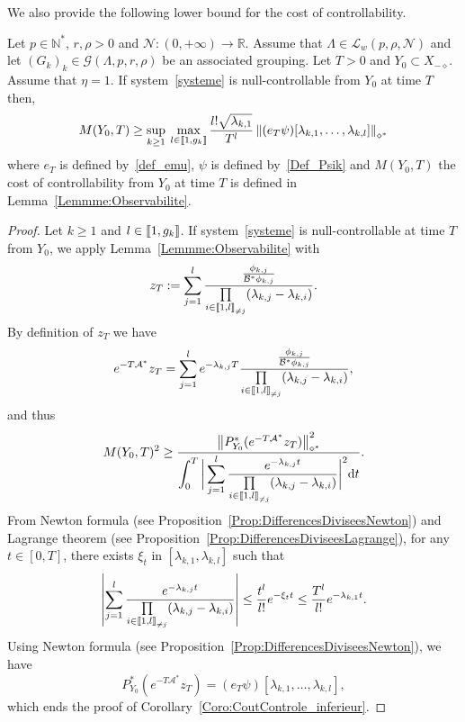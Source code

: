 \documentclass[10pt]{amsart}
\theoremstyle{definition}\newtheorem{defi}[theo]{Definition}\newtheorem{rema}[theo]{Remark}\newtheorem{exam}[theo]{Example}\newtheorem{exem}[theo]{Example}\newtheorem{nota}[theo]{Notation}
\newcommand{\llbracket}{\mathopen{[\mkern -2.7mu[}}
\newcommand{\rrbracket}{\mathclose{]\mkern -2.7mu]}}
\newcommand{\inter}[2]{\llbracket #1,#2 \rrbracket}
\newcommand{\interexclu}[3]{\llbracket #1,#2\rrbracket_{\neq #3}}
\newcommand\As{\mathcal{A}^*}
\newcommand\Bs{\mathcal{B}^*}
\newcommand{\Xmalpha}{X_{-\diamond}}
\newcommand{\Fzp}{Y_0}
\newcommand{\normeXalphas}[1]{\left\| #1 \right\|_{\diamond^*}}
\newcommand{\PFa}{P_{\Fzp}^*}
\newcommand{\n}{g}
\newcommand{\LL}{\mathcal{L}}
\newcommand{\NN}{\mathcal{N}}
\newcommand{\N}{\mathbb{N}}
\newcommand{\R}{\mathbb{R}}
\begin{document}
We also provide the following lower bound for the cost of controllability.
\begin{coro} \label{Coro:CoutControle_inferieur}
Let $p \in \N^*$, $r, \rho > 0$ and $\NN : (0,+\infty) \to \R$. Assume that $\Lambda \in \LL_w(p,\rho, \NN)$ and let $(G_k)_k\in \mathcal{G}(\Lambda,p,r,\rho)$ be an associated grouping. Let $T>0$ and $\Fzp \subset \Xmalpha$. Assume that $\eta=1$. If system~\eqref{systeme} is null-controllable from $\Fzp$ at time $T$ then,
\[
M(\Fzp,T) \geq \sup\limits_{k \geq 1} \: \max\limits_{l \in \inter{1}{\n_k}}
\frac{l! \sqrt{\lambda_{k,1}}}{T^l} \normeXalphas{ (e_T \psi) [\lambda_{k,1}, \dots, \lambda_{k,l}] }
\]
where $e_T$ is defined by~\eqref{def_emu}, $\psi$ is defined by~\eqref{Def_Psik} and $M(\Fzp,T)$ the cost of controllability from $\Fzp$ at time $T$ is defined in Lemma~\ref{Lemmme:Observabilite}.
\end{coro}


\begin{proof}
Let $k\geq1$ and $l \in \inter{1}{\n_k}$. If system~\eqref{systeme} is null-controllable at time $T$ from $\Fzp$, we apply Lemma~\ref{Lemmme:Observabilite} with
\[
z_T:=\sum_{j=1}^{l} \frac{ \frac{\phi_{k,j}}{\Bs \phi_{k,j}} }{\prod\limits_{i\in \interexclu{1}{l}{j}} (\lambda_{k,j}-\lambda_{k,i})}.
\]
By definition of $z_T$ we have
\[
e^{-T \As} z_T = \sum_{j=1}^{l} e^{-\lambda_{k,j} T} \frac{ \frac{\phi_{k,j}}{\Bs \phi_{k,j}} }{\prod\limits_{i\in \interexclu{1}{l}{j}} (\lambda_{k,j}-\lambda_{k,i})},
\]
and thus
\begin{equation*}
M(\Fzp, T)^2 \geq \dfrac{\normeXalphas{ \PFa (e^{-T\As} z_T) }^2}{\displaystyle\int_0^T \bigg| \sum_{j=1}^{l} \frac{e^{-\lambda_{k,j} t}}{\prod\limits_{i\in \interexclu{1}{l}{j}} (\lambda_{k,j}-\lambda_{k,i})} \bigg|^2 \mathrm{d}t}.
\end{equation*}
From Newton formula (see Proposition~\ref{Prop:DifferencesDiviseesNewton}) and Lagrange theorem (see Proposition~\ref{Prop:DifferencesDiviseesLagrange}), for any $t \in [0,T]$, there exists $\xi_{t}$ in $[\lambda_{k,1}, \lambda_{k,l}]$ such that
\[
\left| \sum_{j=1}^{l} \frac{e^{-\lambda_{k,j} t}}{\prod\limits_{i\in \interexclu{1}{l}{j}} (\lambda_{k,j}-\lambda_{k,i})} \right|
\leq \frac{t^{l}}{l!} e^{-\xi_{t} t} \leq \frac{T^{l}}{l!} e^{-\lambda_{k,1} t}.
\]
Using Newton formula (see Proposition~\ref{Prop:DifferencesDiviseesNewton}), we have
\[
\PFa (e^{-T\As} z_T) = (e_T \psi) [\lambda_{k,1}, \dots, \lambda_{k,l}],
\]
which ends the proof of Corollary~\ref{Coro:CoutControle_inferieur}.
\end{proof}
\end{document}
